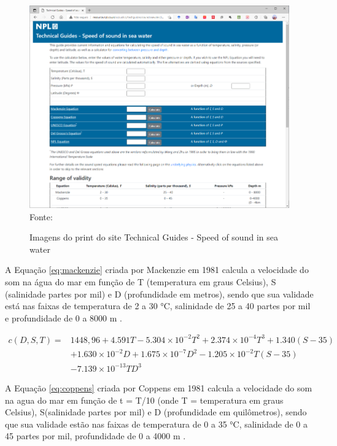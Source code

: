 \begin{figure}[h]
	\centering
	\caption[Imagens do print do site Technical Guides - Speed of sound in sea water]{Imagens do print do site Technical Guides - Speed of sound in sea water}
	\label{fig:npl}
	\includegraphics[width=0.8\linewidth]{images/npl}\\
	\footnotesize Fonte: \cite{techinical}
\end{figure}


A Equação \ref{eq:mackenzie} criada por Mackenzie em 1981 calcula a velocidade do som na água do mar em função de T (temperatura em graus Celsius), S (salinidade partes por mil) e D (profundidade em metros), sendo que sua validade está nas faixas de temperatura de 2 a 30 °C, salinidade de 25 a 40 partes por mil e profundidade de 0 a 8000 m \cite{simpy}.

\begin{equation}
\begin{aligned}
	c(D,S,T) = & 1448,96 + 4.591T - 5.304 \times 10^{-2}T^2 + 2.374 \times 10^{-4}T^3 + 1.340 (S-35)\\ & + 1.630 \times 10^{-2}D + 1.675 \times 10^{-7}D^2 - 1.205 \times 10^{-2}T(S-35)\\& - 7.139 \times 10^{-13}TD^3
\end{aligned}
\label{eq:mackenzie}
\end{equation}

A Equação \ref{eq:coppens} criada por Coppens em 1981 calcula a velocidade do som na agua do mar em função de t = T/10 (onde T = temperatura em graus Celsius), S(salinidade partes por mil) e D (profundidade em quilômetros), sendo que sua validade estão nas faixas de temperatura de 0 a 35 °C, salinidade de 0 a 45 partes por mil, profundidade de 0 a 4000 m \cite{simpy}.


